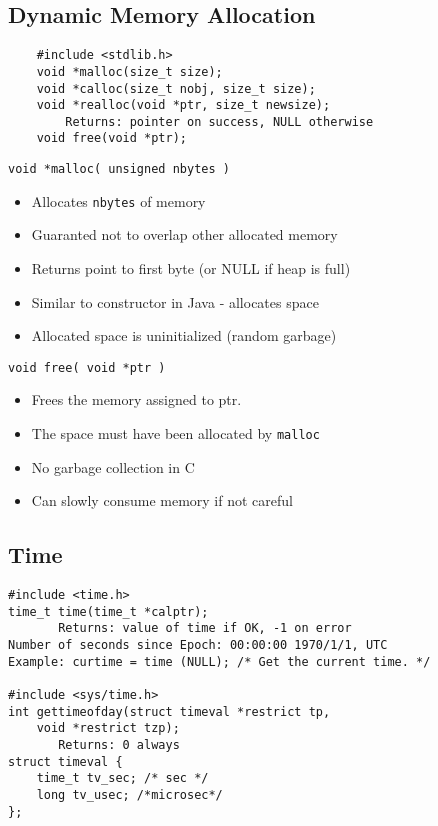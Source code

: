 \documentclass[10pt]{article}
\begin{document}
\begin{multicols}{2}
\begin{minipage}{\columnwidth}
\begin{flushright}
            \subsection*{Dynamic Memory Allocation}
            \begin{lstlisting}
    #include <stdlib.h>
    void *malloc(size_t size);
    void *calloc(size_t nobj, size_t size);
    void *realloc(void *ptr, size_t newsize);
        Returns: pointer on success, NULL otherwise
    void free(void *ptr);
            \end{lstlisting}
            \lstinline|void *malloc( unsigned nbytes )|
            \begin{itemize}
                \setlength{\itemsep}{-0.5em}
                \item Allocates \lstinline|nbytes| of memory
                \item Guaranted not to overlap other allocated memory
                \item Returns point to first byte (or NULL if heap is full)
                \item Similar to constructor in Java - allocates space
                \item Allocated space is uninitialized (random garbage)
            \end{itemize}
            \lstinline|void free( void *ptr )|
            \begin{itemize}
                \setlength{\itemsep}{-0.5em}
                \item Frees the memory assigned to ptr.
                \item The space must have been allocated by \lstinline|malloc|
                \item No garbage collection in C
                \item Can slowly consume memory if not careful
            \end{itemize}
            \vspace*{-4em}
            \subsection*{Time}
            \begin{lstlisting}
#include <time.h>
time_t time(time_t *calptr);
       Returns: value of time if OK, -1 on error
Number of seconds since Epoch: 00:00:00 1970/1/1, UTC
Example: curtime = time (NULL); /* Get the current time. */

#include <sys/time.h>
int gettimeofday(struct timeval *restrict tp,
    void *restrict tzp);
       Returns: 0 always
struct timeval {
    time_t tv_sec; /* sec */
    long tv_usec; /*microsec*/
};
    \end{lstlisting}
        \end{flushright}
    \end{minipage}
\end{multicols}
\end{document}
